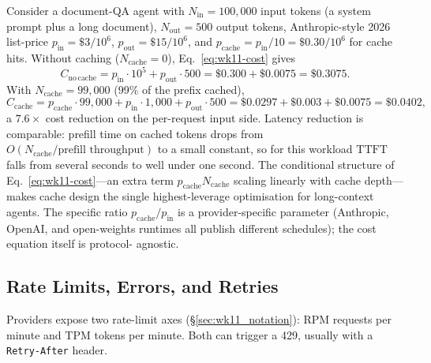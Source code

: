 \begin{workedexample}
Consider a document-QA agent with $N_\mathrm{in} = 100{,}000$
input tokens (a system prompt plus a long document),
$N_\mathrm{out} = 500$ output tokens, Anthropic-style 2026
list-price $p_\mathrm{in} = \$3/10^6$,
$p_\mathrm{out} = \$15/10^6$, and
$p_\mathrm{cache} = p_\mathrm{in}/10 = \$0.30/10^6$ for cache
hits. Without caching ($N_\mathrm{cache} = 0$),
Eq.~\eqref{eq:wk11-cost} gives
\[
  C_\mathrm{no\,cache}
  = p_\mathrm{in}\cdot 10^5 + p_\mathrm{out}\cdot 500
  = \$0.300 + \$0.0075
  = \$0.3075.
\]
With $N_\mathrm{cache} = 99{,}000$ (99\% of the prefix cached),
\[
  C_\mathrm{cache}
  = p_\mathrm{cache}\cdot 99{,}000 + p_\mathrm{in}\cdot 1{,}000
    + p_\mathrm{out}\cdot 500
  = \$0.0297 + \$0.003 + \$0.0075
  = \$0.0402,
\]
a $7.6\times$ cost reduction on the per-request input side.
Latency reduction is comparable: prefill time on cached tokens
drops from $O(N_\mathrm{cache} / \text{prefill throughput})$ to a
small constant, so for this workload $\mathrm{TTFT}$ falls from
several seconds to well under one second. The conditional
structure of Eq.~\eqref{eq:wk11-cost}---an extra term
$p_\mathrm{cache} N_\mathrm{cache}$ scaling linearly with cache
depth---makes cache design the single highest-leverage
optimisation for long-context agents. The specific ratio
$p_\mathrm{cache}/p_\mathrm{in}$ is a provider-specific parameter
(Anthropic, OpenAI, and open-weights runtimes all publish
different schedules); the cost equation itself is protocol-
agnostic.
\end{workedexample}

\subsection{Rate Limits, Errors, and Retries}

Providers expose two rate-limit axes (\S\ref{sec:wk11_notation}):
$\mathrm{RPM}$ requests per minute and $\mathrm{TPM}$ tokens per
minute. Both can trigger a 429, usually with a \texttt{Retry-After}
header.

